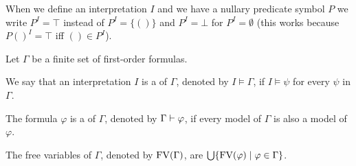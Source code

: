 When we define an interpretation $I$ and we have a nullary predicate symbol $P$ we write $P^I=\top$ instead of $P^I=\{()\}$ and $P^I=\bot$ for $P^I=\emptyset$ (this works because $P()^I=\top$ iff $()\in P^I$).
\begin{definition} %
	Let $\Gamma$ be a finite set of first-order formulas.
	\begin{description}
		\item We say that an interpretation $I$ is a  of $\Gamma$, denoted by $I\models\Gamma$, if $I\models\psi$ for every $\psi$ in $\Gamma$.
		\item The formula $\varphi$ is a  of $\Gamma$, denoted by $\Gamma\vdash\varphi$, if every model of $\Gamma$ is also a model of $\varphi$.
		\item The free variables of $\Gamma$, denoted by $\text{FV}(\Gamma)$, are $\bigcup\{\text{FV}(\varphi)\mid \varphi\in \Gamma\}$.
	\end{description}
\end{definition}

